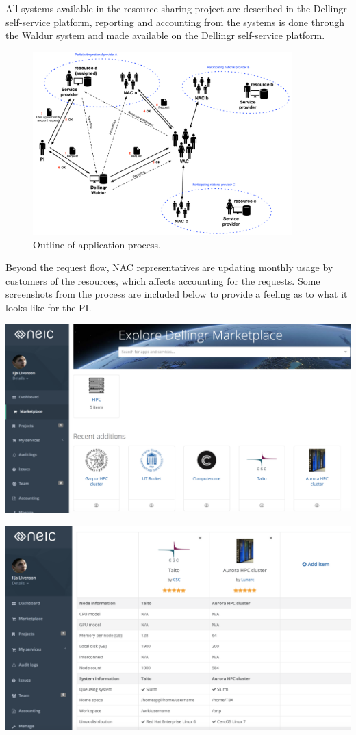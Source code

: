 \documentclass{article}
\begin{document}
\begin{itemize}
All systems available in the resource sharing project are described in the Dellingr self-service platform, reporting and accounting from the systems is done through the Waldur system and made available on the Dellingr self-service platform.
\begin{figure}[!ht]
\centering
\includegraphics[width=10cm]{Dellingr_pilot2.png}
\caption{Outline of application process.}\label{fig:pilot2_application}
\end{figure}

\end{itemize}

Beyond the request flow, NAC representatives are updating monthly usage by customers of the resources, which affects accounting for the requests. Some screenshots from the process are included below to provide a feeling as to what it looks like for the PI.

\includegraphics[width=16cm]{images/marketplace.png}

\includegraphics[width=16cm]{images/compare.png}
\end{document}
